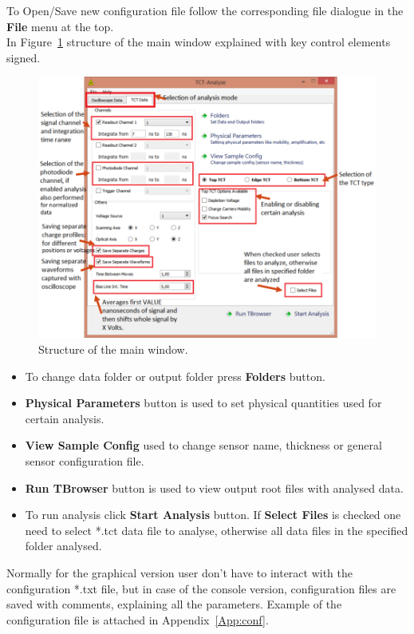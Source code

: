 \documentclass[12pt,oneside,notitlepage,abstracton,a4paper]{scrartcl}
\begin{document}
\indent To Open/Save new configuration file follow the corresponding file dialogue in the \textbf{File} menu at the top.
\\ \indent In Figure~\ref{fig:main_structure} structure of the main window explained with key control elements signed. 

\begin{figure}[h]
    \centering
    \includegraphics[width=18cm]{pics/main_structure}
    \caption{Structure of the main window.}
    \label{fig:main_structure}
\end{figure}

\begin{itemize}
\item To change data folder or output folder press \textbf{Folders} button.
\item \textbf{Physical Parameters} button is used to set physical quantities used for certain analysis.
\item \textbf{View Sample Config} used to change sensor name, thickness or general sensor configuration file.
\item \textbf{Run TBrowser} button is used to view output root files with analysed data.
\item To run analysis click \textbf{Start Analysis} button. If \textbf{Select Files} is checked one need to select *.tct data file to analyse, otherwise all data files in the specified folder analysed.
\end{itemize}

Normally for the graphical version user don't have to interact with the configuration *.txt file, but in case of the console version, configuration files are saved with comments, explaining all the parameters. Example of the configuration file is attached in Appendix~\ref{App:conf}.
\\ \indent 
\end{document}
